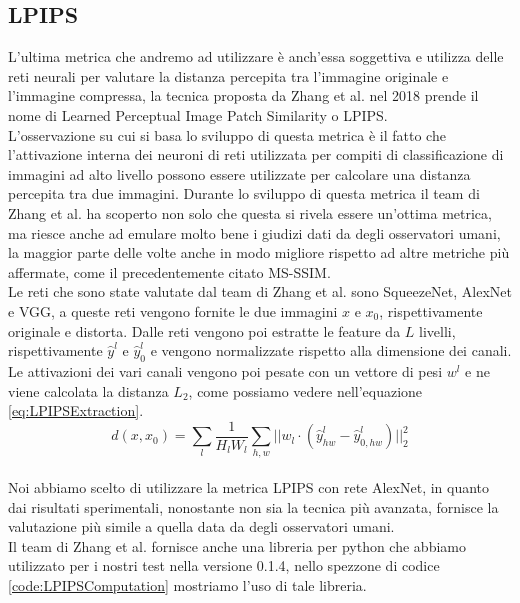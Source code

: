 \subsection{LPIPS}
L’ultima metrica che andremo ad utilizzare è anch'essa soggettiva e utilizza delle reti neurali per valutare la distanza percepita tra l’immagine originale e l’immagine compressa, la tecnica proposta da Zhang et al. nel 2018 \cite{zhang2018unreasonable} prende il nome di Learned Perceptual Image Patch Similarity o LPIPS.\\
L’osservazione su cui si basa lo sviluppo di questa metrica è il fatto che l’attivazione interna dei neuroni di reti utilizzata per compiti di classificazione di immagini ad alto livello possono essere utilizzate per calcolare una distanza percepita tra due immagini. Durante lo sviluppo di questa metrica il team di Zhang et al. ha scoperto non solo che questa si rivela essere un’ottima metrica, ma riesce anche ad emulare molto bene i giudizi dati da degli osservatori umani, la maggior parte delle volte anche in modo migliore rispetto ad altre metriche più affermate, come il precedentemente citato MS-SSIM.\\
Le reti che sono state valutate dal team di Zhang et al. sono SqueezeNet, AlexNet e VGG, a queste reti vengono fornite le due immagini $x$ e $x_{0}$, rispettivamente originale e distorta. Dalle reti vengono poi estratte le feature da $L$ livelli, rispettivamente $\hat{y}^l$ e $\hat{y}_{0}^l$ e vengono normalizzate rispetto alla dimensione dei canali. Le attivazioni dei vari canali vengono poi pesate con un vettore di pesi $w^l$ e ne viene calcolata la distanza $L_{2}$, come possiamo vedere nell’equazione \ref{eq:LPIPSExtraction}.\\
\begin{equation}\label{eq:LPIPSExtraction}
    d(x,x_{0}) = \sum_{l}\dfrac{1}{H_{l}W_{l}} \sum_{h,w} || w_{l} \cdot (\hat{y}_{hw}^{l} - \hat{y}_{0,hw}^{l}) ||_{2}^{2}
\end{equation}\\
Noi abbiamo scelto di utilizzare la metrica LPIPS con rete AlexNet, in quanto dai risultati sperimentali, nonostante non sia la tecnica più avanzata, fornisce la valutazione più simile a quella data da degli osservatori umani.\\
Il team di Zhang et al. fornisce anche una libreria per python che abbiamo utilizzato per i nostri test nella versione 0.1.4, nello spezzone di codice \ref{code:LPIPSComputation} mostriamo l'uso di tale libreria.\\
